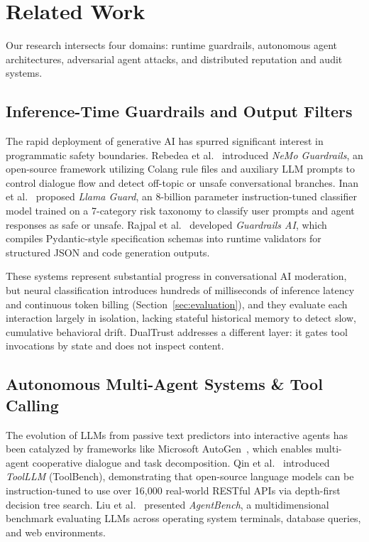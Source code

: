 \documentclass[journal]{IEEEtran}
\begin{document}
\section{Related Work}
\label{sec:related_work}

Our research intersects four domains: runtime guardrails, autonomous agent architectures, adversarial agent attacks, and distributed reputation and audit systems.

\subsection{Inference-Time Guardrails and Output Filters}
The rapid deployment of generative AI has spurred significant interest in programmatic safety boundaries. Rebedea et al.~\cite{rebedea2023nemo} introduced \emph{NeMo Guardrails}, an open-source framework utilizing Colang rule files and auxiliary LLM prompts to control dialogue flow and detect off-topic or unsafe conversational branches. Inan et al.~\cite{inan2023llama} proposed \emph{Llama Guard}, an 8-billion parameter instruction-tuned classifier model trained on a 7-category risk taxonomy to classify user prompts and agent responses as safe or unsafe. Rajpal et al.~\cite{rajpal2024guardrails} developed \emph{Guardrails AI}, which compiles Pydantic-style specification schemas into runtime validators for structured JSON and code generation outputs.

These systems represent substantial progress in conversational AI moderation, but neural classification introduces hundreds of milliseconds of inference latency and continuous token billing (Section~\ref{sec:evaluation}), and they evaluate each interaction largely in isolation, lacking stateful historical memory to detect slow, cumulative behavioral drift. DualTrust addresses a different layer: it gates tool invocations by state and does not inspect content.

\subsection{Autonomous Multi-Agent Systems \& Tool Calling}
The evolution of LLMs from passive text predictors into interactive agents has been catalyzed by frameworks like Microsoft AutoGen~\cite{wu2023autogen}, which enables multi-agent cooperative dialogue and task decomposition. Qin et al.~\cite{qin2024toolllm} introduced \emph{ToolLLM} (ToolBench), demonstrating that open-source language models can be instruction-tuned to use over 16,000 real-world RESTful APIs via depth-first decision tree search. Liu et al.~\cite{liu2024agentbench} presented \emph{AgentBench}, a multidimensional benchmark evaluating LLMs across operating system terminals, database queries, and web environments.
\end{document}
